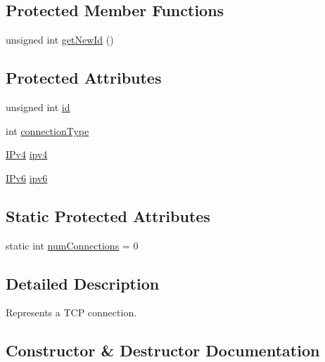 \subsection*{Protected Member Functions}
\begin{DoxyCompactItemize}
\item 
unsigned int \hyperlink{class_rad_j_a_v_1_1_networking_1_1_t_c_p_connection_a13ed8b099258871e241e52b14d568073}{get\+New\+Id} ()
\end{DoxyCompactItemize}
\subsection*{Protected Attributes}
\begin{DoxyCompactItemize}
\item 
unsigned int \hyperlink{class_rad_j_a_v_1_1_networking_1_1_t_c_p_connection_ac513874994cf8b03127b001e5a7094bd}{id}
\item 
int \hyperlink{class_rad_j_a_v_1_1_networking_1_1_t_c_p_connection_ae24db0c9dac2a7ae3c41afd17ff65d80}{connection\+Type}
\item 
\hyperlink{class_rad_j_a_v_1_1_networking_1_1_i_pv4}{I\+Pv4} \hyperlink{class_rad_j_a_v_1_1_networking_1_1_t_c_p_connection_a2dc53527dc30118419d87d2934d032ae}{ipv4}
\item 
\hyperlink{class_rad_j_a_v_1_1_networking_1_1_i_pv6}{I\+Pv6} \hyperlink{class_rad_j_a_v_1_1_networking_1_1_t_c_p_connection_a3ddda74035ec41a86c9431c084cd0097}{ipv6}
\end{DoxyCompactItemize}
\subsection*{Static Protected Attributes}
\begin{DoxyCompactItemize}
\item 
static int \hyperlink{class_rad_j_a_v_1_1_networking_1_1_t_c_p_connection_a342f7c52a3e4c2567b8263f68109ffcb}{num\+Connections} = 0
\end{DoxyCompactItemize}


\subsection{Detailed Description}
Represents a T\+CP connection. 

\subsection{Constructor \& Destructor Documentation}
